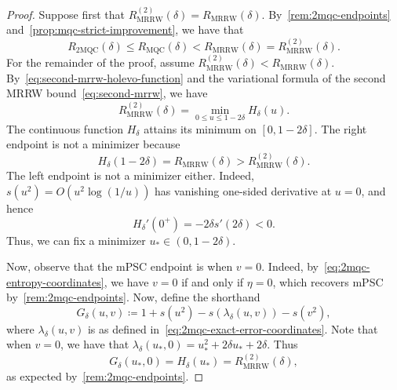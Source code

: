 \documentclass[11pt]{article}
\renewcommand{\leq}{\leqslant}
\theoremstyle{remark}
\newcommand{\MRRW}{R_{\mathrm{MRRW}}}
\newcommand{\MQC}{\mathrm{MQC}}
\newcommand{\mMQC}{2\mathrm{MQC}}
\begin{document}
\begin{proof}
Suppose first that $\MRRW^{(2)}(\delta) = \MRRW(\delta)$. By~\cref{rem:2mqc-endpoints} and~\cref{prop:mqc-strict-improvement}, we have that 
\begin{equation*}
R_{\mMQC}(\delta)
\leq R_{\MQC}(\delta)
< \MRRW(\delta)
= \MRRW^{(2)}(\delta).
\end{equation*}
For the remainder of the proof, assume $\MRRW^{(2)}(\delta) < \MRRW(\delta)$. 
By~\eqref{eq:second-mrrw-holevo-function} and the variational formula of the second MRRW bound~\eqref{eq:second-mrrw}, we have
\begin{equation*}
\MRRW^{(2)}(\delta) = \min_{0 \leq u \leq 1-2\delta}{H_\delta(u)}.
\end{equation*}
The continuous function $H_\delta$ attains its minimum on $[0,1-2\delta]$. The right endpoint is not a minimizer because
\begin{equation*}
H_\delta(1-2\delta) = \MRRW(\delta) > \MRRW^{(2)}(\delta).
\end{equation*}
The left endpoint is not a minimizer either. Indeed, $s(u^2) = O(u^2\log(1/u))$ has vanishing one-sided derivative at $u = 0$, and hence
\begin{equation*}
H_\delta'(0^+) = -2\delta s'(2\delta) < 0.
\end{equation*}
Thus, we can fix a minimizer $u_* \in (0,1-2\delta)$.

Now, observe that the mPSC endpoint is when $v = 0$. Indeed, by~\eqref{eq:2mqc-entropy-coordinates}, we have $v = 0$ if and only if $\eta = 0$, which recovers mPSC by~\cref{rem:2mqc-endpoints}. Now, define the shorthand
\begin{equation}
\label{eq:2mqc-exact-error-objective}
G_\delta(u,v)
\coloneqq
1+s(u^2)-s\left(\lambda_\delta(u,v)\right)-s(v^2),
\end{equation}
where $\lambda_\delta(u,v)$ is as defined in~\cref{eq:2mqc-exact-error-coordinates}. Note that when $v = 0$, we have that $\lambda_\delta(u_*,0) = u_*^2 + 2\delta u_* + 2\delta$. Thus
\begin{equation}
\label{eq:j-to-mrrw}
G_\delta(u_*,0)
= H_\delta(u_*)
= \MRRW^{(2)}(\delta),
\end{equation}
as expected by~\cref{rem:2mqc-endpoints}. 


\end{proof}
\end{document}

